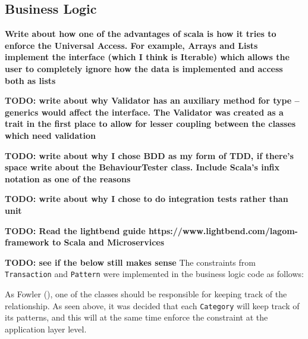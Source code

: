 \subsection{Business Logic} \label{sec:Implementation.BusinessLogic}

\textbf{Write about how one of the advantages of scala is how it tries to
enforce the Universal Access. For example, Arrays and Lists implement the
interface (which I think is Iterable) which allows the user to completely
ignore how the data is implemented and access both as lists}

\textbf{TODO: write about why Validator has an auxiliary method for type --
generics would affect the interface. The Validator was created as a trait in
the first place to allow for lesser coupling between the classes which need
validation}

\textbf{TODO: write about why I chose BDD as my form of TDD, if there's space
write about the BehaviourTester class. Include Scala's infix notation as one of
the reasons}

\textbf{TODO: write about why I chose to do integration tests rather than unit}

\textbf{TODO: Read the lightbend guide
https://www.lightbend.com/lagom-framework to Scala and Microservices}

\textbf{TODO: see if the below still makes sense}
The constraints from \texttt{Transaction} and \texttt{Pattern} were implemented
in the business logic code as follows:
{
  \small
  
}

{
  \small
  
}

As Fowler (\citeyear[][]{fowler1997analysis}), one of the classes should be
responsible for keeping track of the relationship. As seen above, it was
decided that each \texttt{Category} will keep track of its patterns, and this
will at the same time enforce the constraint at the application layer level.
